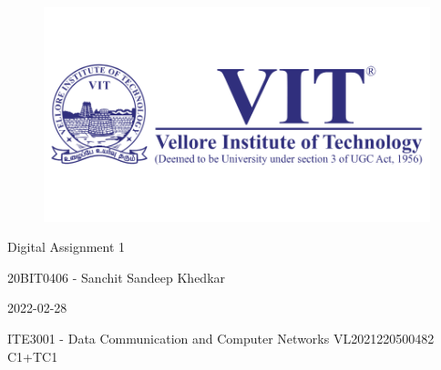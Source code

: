 \documentclass[12pt]{article}
\begin{document}
\begin{titlepage}
\NoBgThispage
   \begin{center}
        \begin{figure}[h] %
        \centering
        \includegraphics[width=15cm]{1583124354phpJTtnK5.png}
        \end{figure}

        \Huge{Digital Assignment 1}

        \vspace{0.5cm}
        \LARGE{20BIT0406 - Sanchit Sandeep Khedkar}
       
        \vspace{2.5 cm}
        \Large{2022-02-28}
        
        \vspace{0.25 cm}
        \Large{ITE3001 - Data Communication and Computer Networks}
        \large{VL2021220500482 C1+TC1}
       

       \vfill
    \end{center}
\end{titlepage}
\newpage
\end{document}
